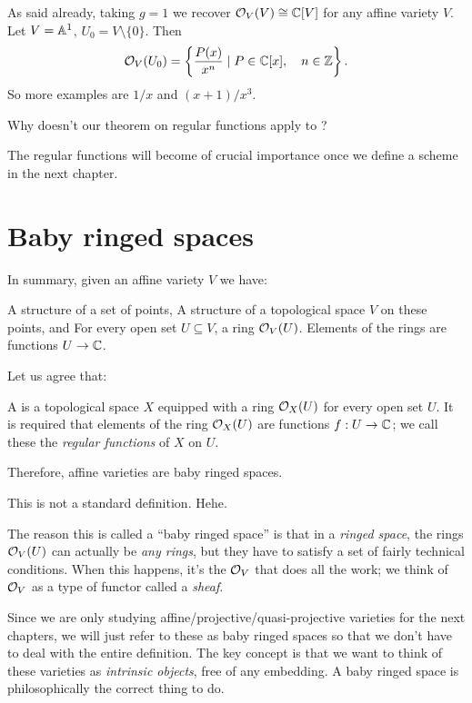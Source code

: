 \begin{example}
	\listhack
	\begin{enumerate}[(a)]
		\ii As said already,
		taking $g=1$ we recover $\mathcal O_V(V) \cong \mathbb C[V]$
		for any affine variety $V$.
		\ii Let $V = \mathbb A^1$, $U_0 = V \setminus \{0\}$. Then
		\[ \mathcal O_V(U_0)
			= \left\{ \frac{P(x)}{x^n} \mid P \in \mathbb C[x],
			\quad n \in \mathbb Z \right\}. \]
		So more examples are $1/x$ and $(x+1)/x^3$.
	\end{enumerate}
\end{example}

\begin{ques}
	Why doesn't our theorem on regular functions apply to ?
\end{ques}

The regular functions will become of crucial importance
once we define a scheme in the next chapter.

\section{Baby ringed spaces}
In summary, given an affine variety $V$ we have:
\begin{itemize}
	\ii A structure of a set of points,
	\ii A structure of a topological space $V$ on these points, and
	\ii For every open set $U \subseteq V$, a ring $\mathcal O_V(U)$.
	Elements of the rings are functions $U \to \mathbb C$.
\end{itemize}
Let us agree that:
\begin{definition}
	A  is a topological space $X$
	equipped with a ring $\mathcal O_X(U)$ for every open set $U$.
	It is required that elements of the ring $\mathcal O_X(U)$
	are functions $f : U \to \mathbb C$;
	we call these the \emph{regular functions} of $X$ on $U$.
\end{definition}
Therefore, affine varieties are baby ringed spaces.
\begin{remark}
	This is not a standard definition. Hehe.
\end{remark}

The reason this is called a ``baby ringed space''
is that in a \emph{ringed space},
the rings $\mathcal O_V(U)$ can actually be \emph{any rings},
but they have to satisfy a set of fairly technical conditions.
When this happens, it's the $\mathcal O_V$ that does all the work;
we think of $\mathcal O_V$ as a type of functor called a \emph{sheaf}.

Since we are only studying affine/projective/quasi-projective varieties
for the next chapters, we will just refer to these as baby ringed spaces
so that we don't have to deal with the entire definition.
The key concept is that we want to think of these varieties
as \emph{intrinsic objects}, free of any embedding.
A baby ringed space is philosophically the correct thing to do.

